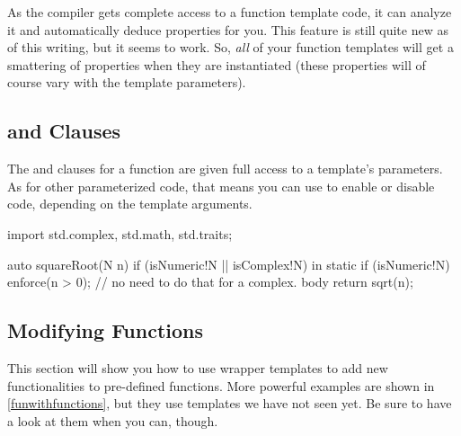 As the compiler gets complete access to a function template code, it can analyze it and automatically deduce properties for you. This feature is still quite new as of this writing, but it seems to work. So, \emph{all} of your function templates will get a smattering of properties when they are instantiated (these properties will of course vary with the template parameters).

\subsection{\texorpdfstring{ and  Clauses}
                           {in and out Clauses}}
\label{inandoutclauses}

The  and  clauses for a function are given full access to a template's parameters. As for other parameterized code, that means you can use  to enable or disable code, depending on the template arguments.

\begin{dcode}
import std.complex, std.math, std.traits;

auto squareRoot(N n) if (isNumeric!N || isComplex!N)
in 
{
    static if (isNumeric!N)
        enforce(n > 0);
    // no need to do that for a complex.
}
body
{
    return sqrt(n);
}
\end{dcode}

\subsection{Modifying Functions}\label{modifyingfunctions}

This section will show you how to use wrapper templates to add new functionalities to pre-defined functions. More powerful examples are shown in \autoref{funwithfunctions}, but they use templates we have not seen yet. Be sure to have a look at them when you can, though.


